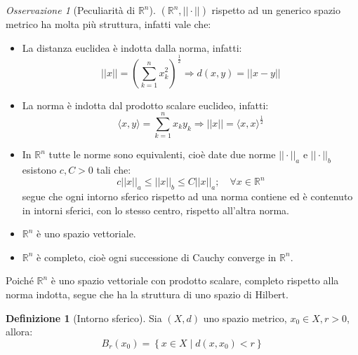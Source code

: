 \documentclass[11pt, a4paper, openright]{book}
\theoremstyle{plain}
\theoremstyle{definition}
\newtheorem{definizione}[teorema]{Definizione}
\theoremstyle{remark}
\newtheorem{osservazione}[teorema]{Osservazione}
\newcommand{\innerprod}[2]{\langle #1, #2 \rangle}
\begin{document}
\begin{osservazione}[Peculiarità di $\mathbb{R}^n$]
    $(\mathbb{R}^n, ||\cdot||)$ rispetto ad un generico spazio metrico ha molta più struttura, infatti vale che:
    \begin{itemize}
        \item La distanza euclidea è indotta dalla norma, infatti:
        \begin{equation}
            ||x|| = \left(\sum_{k = 1}^{n} x_k^2 \right)^{\frac{1}{2}} \Longrightarrow d(x, y) = ||x - y||            
        \end{equation}
        \item La norma è indotta dal prodotto scalare euclideo, infatti:
        \begin{equation}
            \innerprod{x}{y} = \sum_{k = 1}^{n} x_ky_k \Longrightarrow ||x|| = \innerprod{x}{x}^{\frac{1}{2}}
        \end{equation}
        \item In $\mathbb{R}^n$ tutte le norme sono equivalenti, cioè date due norme $||\cdot||_a$ e $||\cdot||_b$ esistono $c, C > 0$ tali che:
        \begin{equation}
            c||x||_a \leq ||x||_b \leq C||x||_a; \quad \forall x \in \mathbb{R}^n
        \end{equation}
        segue che ogni intorno sferico rispetto ad una norma contiene ed è contenuto in intorni sferici, con lo stesso centro, rispetto all'altra norma.
        \item $\mathbb{R}^n$ è uno spazio vettoriale.
        \item $\mathbb{R}^n$ è completo, cioè ogni successione di Cauchy converge in $\mathbb{R}^n$.
    \end{itemize}
    Poiché $\mathbb{R}^n$ è uno spazio vettoriale con prodotto scalare, completo rispetto alla norma indotta, segue che ha la struttura di uno spazio di Hilbert.
\end{osservazione}

\begin{definizione}[Intorno sferico]
    Sia $(X, d)$ uno spazio metrico, $x_0 \in X, r > 0$, allora:
    \begin{equation}
        B_r(x_0) = \left\{x \in X \; | \; d(x, x_0) < r\right\}
    \end{equation}
\end{definizione}
\end{document}
